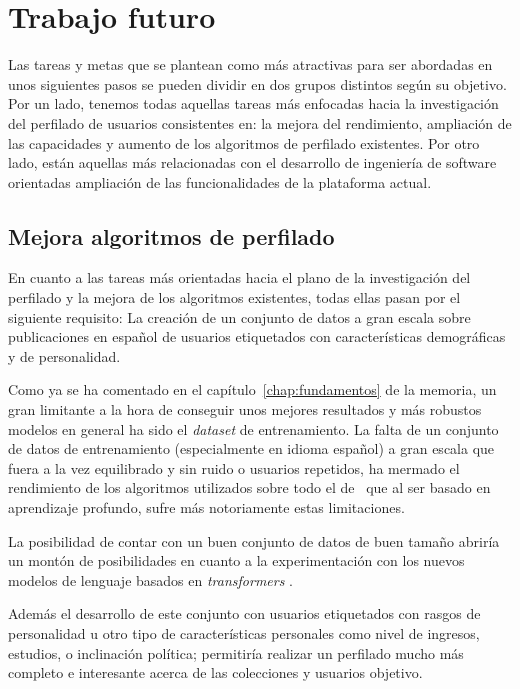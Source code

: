 \section{Trabajo futuro}
Las tareas y metas que se plantean como más atractivas para ser abordadas en unos siguientes pasos se pueden dividir en dos grupos distintos según su objetivo. Por un lado, tenemos todas aquellas tareas más enfocadas hacia la investigación del perfilado de usuarios consistentes en: la mejora del rendimiento, ampliación de las capacidades y aumento de los algoritmos de perfilado existentes. Por otro lado, están aquellas más relacionadas con el desarrollo de ingeniería de software orientadas ampliación de las funcionalidades de la plataforma actual.

\subsection{Mejora algoritmos de perfilado}
En cuanto a las tareas más orientadas hacia el plano de la investigación del perfilado y la mejora de los algoritmos existentes, todas ellas pasan por el siguiente requisito: La creación de un conjunto de datos a gran escala sobre publicaciones en español de usuarios etiquetados con características demográficas y de personalidad.

Como ya se ha comentado en el capítulo~\ref{chap:fundamentos} de la memoria, un gran limitante a la hora de conseguir unos mejores resultados y más robustos modelos en general ha sido el \textit{dataset} de entrenamiento. La falta de un conjunto de datos de entrenamiento (especialmente en idioma español) a gran escala que fuera a la vez equilibrado y sin ruido o usuarios repetidos, ha mermado el rendimiento de los algoritmos utilizados sobre todo el de~\citet{loscalis22} que al ser basado en aprendizaje profundo, sufre más notoriamente estas limitaciones.

La posibilidad de contar con un buen conjunto de datos de buen tamaño abriría un montón de posibilidades en cuanto a la experimentación con los nuevos modelos de lenguaje basados en \textit{transformers} \citep{devlin2019bert, liu2019roberta, BETO, MarIA, gpt2020language}.

Además el desarrollo de este conjunto con usuarios etiquetados con rasgos de personalidad u otro tipo de características personales como nivel de ingresos, estudios, o inclinación política; permitiría realizar un perfilado mucho más completo e interesante acerca de las colecciones y usuarios objetivo.

